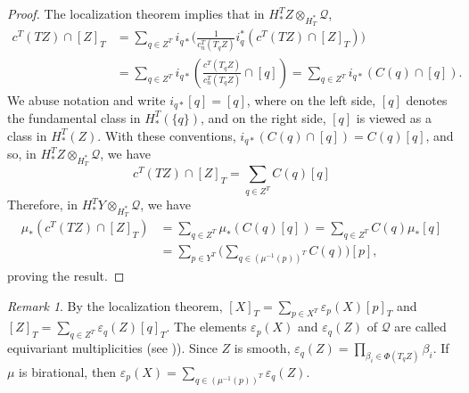 \documentclass[11pt,letterpaper,reqno]{amsart}
\numberwithin{equation}{section}
\theoremstyle{plain}
\theoremstyle{definition}
\theoremstyle{remark}
\newtheorem{remark}[theorem]{Remark}
\newcommand{\cq}{\mathcal{Q}}
\newcommand{\gb}{\beta}
\begin{document}
\begin{proof}
The localization theorem implies that in $H^T_*Z \otimes_{H^*_T} \cq$,
\begin{align*}
c^T(TZ) \cap [Z]_T & = \sum_{q \in Z^T}  i_{q*}  \Big( \frac{1}{c^T_n(T_q Z)} i_q^{*}  (c^T(TZ) \cap [Z]_T) \Big) \\
& = \sum_{q \in Z^T}  i_{q*} (\frac{c^T(T_q Z)}{c_n^T(T_q Z)} \cap [q]) = \sum_{q \in Z^T}  i_{q*} (C(q) \cap [q]).
\end{align*}
We abuse notation and write $ i_{q*} [q] = [q]$, where on the left side, $[q]$ denotes the fundamental class in
$H_*^T(\{ q \})$, and on the right side, $[q]$ is viewed as a class in $H_*^T(Z)$.  With these conventions,
$ i_{q*} (C(q) \cap [q]) = C(q) [q]$, and so, in $H^T_*Z \otimes_{H^*_T} \cq$, we have
$$
c^T(TZ) \cap [Z]_T = \sum_{q \in Z^T} C(q) [q]
$$
Therefore, in $H^T_*Y \otimes_{H^*_T} \cq$, we have
\begin{align*}
\mu_* (c^T(TZ) \cap [Z]_T)  & = \sum_{q \in Z^T} \mu_*(C(q) [q]) = \sum_{q \in Z^T} C(q) \mu_* [q] \\
& = \sum_{p \in Y^T} \Big( \sum_{q \in (\mu^{-1}(p))^T} C(q) \Big) [p],
\end{align*}
proving the result.
\end{proof}

\begin{remark} \label{r:eq-mult}
By the localization theorem, $[X]_T = \sum_{p \in X^T} \varepsilon_p(X) [p]_T$
and $[Z]_T = \sum_{q \in Z^T} \varepsilon_q(Z) [q]_T$.  The elements $\varepsilon_p(X)$ and $\varepsilon_q(Z)$ of $\cq$
are called equivariant multiplicities (see \cite{Brion1997})).
Since $Z$ is smooth, $\varepsilon_q(Z) = \prod_{\gb_i \in \Phi(T_q Z)} \gb_i$.  If $\mu$ is birational, then 
$\varepsilon_p(X) = \sum_{q \in (\mu^{-1}(p))^T} \varepsilon_q(Z)$.
\end{remark}
\end{document}

